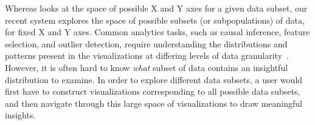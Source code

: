 \smallskip
{}
Whereas \seedb looks at the space of possible X and Y axes for a given data subset, our recent system \sbd explores 
the space of possible subsets 
(or subpopulations) of data,
for fixed X and Y axes.
Common analytics tasks, 
such as causal inference, 
feature selection, and outlier detection, 
require understanding the distributions and 
patterns present in the visualizations 
at differing levels of data granularity~\cite{Anand2015,Heer2012,Wu2013}. 
However, it is often hard to know \textit{what} 
subset of data contains an 
insightful distribution to examine. 
In order to explore different data subsets, 
a user would first have to 
construct visualizations 
corresponding to all possible data subsets, 
and then navigate through this large space of 
visualizations to draw meaningful insights. 


